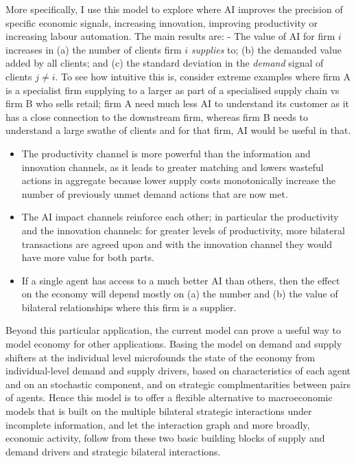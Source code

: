 \documentclass[
]{article}
\theoremstyle{definition}
\theoremstyle{plain}
\theoremstyle{remark}
\begin{document}
More specifically, I use this model to explore where AI improves the
precision of specific economic signals, increasing innovation, improving
productivity or increasing labour automation. The main results are: -
The value of AI for firm \(i\) increases in (a) the number of clients
firm \(i\) \emph{supplies} to; (b) the demanded value added by all
clients; and (c) the standard deviation in the \emph{demand} signal of
clients \(j \neq i\). To see how intuitive this is, consider extreme
examples where firm A is a specialist firm supplying to a larger as part
of a specialised supply chain vs firm B who sells retail; firm A need
much less AI to understand its customer as it has a close connection to
the downstream firm, whereas firm B needs to understand a large swathe
of clients and for that firm, AI would be useful in that.

\begin{itemize}
\item
  The productivity channel is more powerful than the information and
  innovation channels, as it leads to greater matching and lowers
  wasteful actions in aggregate because lower supply costs monotonically
  increase the number of previously unmet demand actions that are now
  met.
\item
  The AI impact channels reinforce each other; in particular the
  productivity and the innovation channels: for greater levels of
  productivity, more bilateral transactions are agreed upon and with the
  innovation channel they would have more value for both parts.
\item
  If a single agent has access to a much better AI than others, then the
  effect on the economy will depend mostly on (a) the number and (b) the
  value of bilateral relationships where this firm is a supplier.
\end{itemize}

Beyond this particular application, the current model can prove a useful
way to model economy for other applications. Basing the model on demand
and supply shifters at the individual level microfounds the state of the
economy from individual-level demand and supply drivers, based on
characteristics of each agent and on an stochastic component, and on
strategic complmentarities between pairs of agents. Hence this model is
to offer a flexible alternative to macroeconomic models that is built on
the multiple bilateral strategic interactions under incomplete
information, and let the interaction graph and more broadly, economic
activity, follow from these two basic building blocks of supply and
demand drivers and strategic bilateral interactions.
\end{document}
